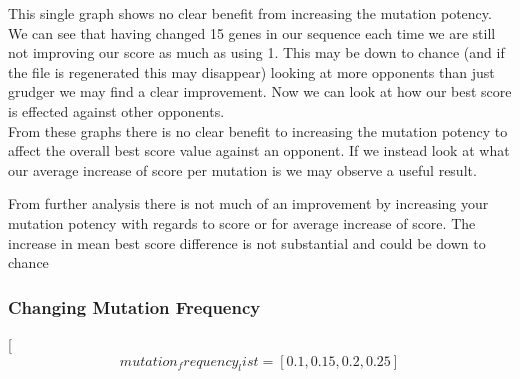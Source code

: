 
        This single graph shows no clear benefit from increasing the mutation potency. We can see that having changed 15 genes in our sequence each time we are still not improving our score as much as using 1. This may be down to chance (and if the file is regenerated this may disappear) looking at more opponents than just grudger we may find a clear improvement.
        Now we can look at how our best score is effected against other opponents.\\
        

        From these graphs there is no clear benefit to increasing the mutation potency to affect the overall best score value against an opponent. If we instead look at what our average increase of score per mutation is we may observe a useful result.


        From further analysis there is not much of an improvement by increasing your mutation potency with regards to score or for average increase of score. The increase in mean best score difference is not substantial and could be down to chance

        \subsubsection{Changing Mutation Frequency}

        [\[mutation_frequency_list = [0.1,0.15,0.2,0.25]\]

